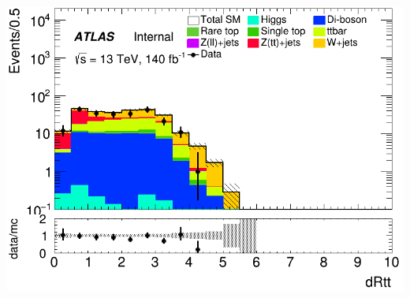 \documentclass[usenames,dvipsnames]{beamer}
\begin{document}
\begin{frame}
\begin{minipage}{0.32\textwidth}
        \includegraphics[width=\textwidth]{graphics/LHH_met/LHH_met_dRtt.png}
    \end{minipage}
\end{frame}
\end{document}
